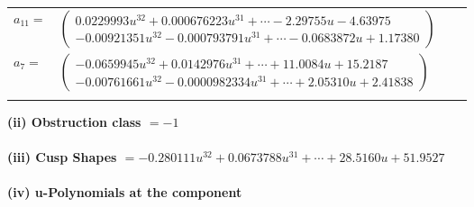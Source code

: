 \documentclass[1p]{elsarticle_modified}
\theoremstyle{definition}
\begin{document}
\begin{tabular}{m{7pt} m{180pt} m{7pt} m{180pt} }
\flushright $a_{11}=$&$\begin{pmatrix}0.0229993 u^{32}+0.000676223 u^{31}+\cdots-2.29755 u-4.63975\\-0.00921351 u^{32}-0.000793791 u^{31}+\cdots-0.0683872 u+1.17380\end{pmatrix}$ \\
\flushright $a_{7}=$&$\begin{pmatrix}-0.0659945 u^{32}+0.0142976 u^{31}+\cdots+11.0084 u+15.2187\\-0.00761661 u^{32}-0.0000982334 u^{31}+\cdots+2.05310 u+2.41838\end{pmatrix}$\\&\end{tabular}
\flushleft \textbf{(ii) Obstruction class $= -1$}\\~\\
\flushleft \textbf{(iii) Cusp Shapes $= -0.280111 u^{32}+0.0673788 u^{31}+\cdots+28.5160 u+51.9527$}\\~\\
\newpage\renewcommand{\arraystretch}{1}
\flushleft \textbf{(iv) u-Polynomials at the component}\newline \\
\end{document}
